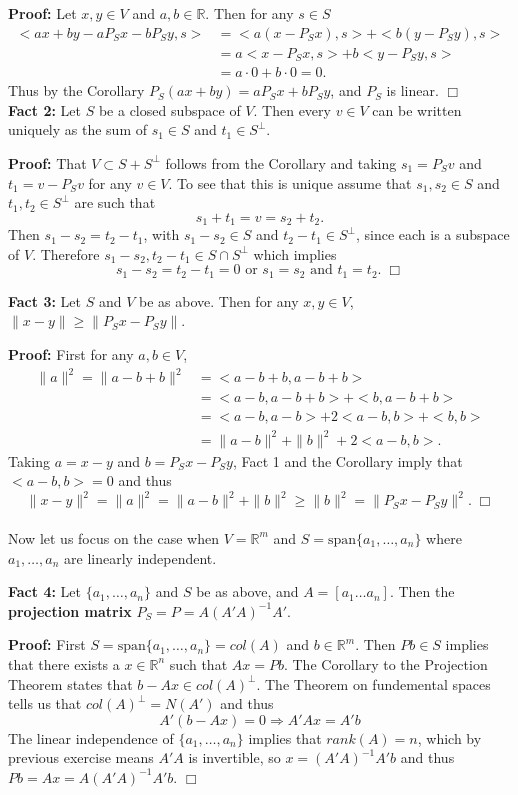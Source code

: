 \documentclass[12pt,oneside]{article}
\begin{document}
\textbf{Proof:} Let \(x,y \in V\) and \(a,b \in \mathbb{R} \). Then for any \(s \in S \)
\begin{align*}
<ax+by-aP_Sx-bP_Sy,s> &=  <a(x-P_Sx),s> + <b(y-P_Sy),s> \\
&= a<x-P_Sx,s> + b<y-P_Sy,s> \\
& = a\cdot 0+b \cdot 0=0.
\end{align*}
Thus by the Corollary \( P_S(ax+by)=aP_Sx+bP_Sy\), and \(P_S\) is linear. \(\Box\) \\

\noindent\textbf{Fact 2:} Let \(S\) be a closed subspace of \(V\). Then every \(v \in V\) can be written uniquely as the sum of \(s_1 \in S\) and \( t_1 \in S^{\perp}\).

\textbf{Proof:} That \( V \subset S + S^{\perp} \) follows from the Corollary and taking \(s_1=P_Sv\) and \(t_1=v-P_Sv\) for any \(v \in V\). To see that this is unique assume that \(s_1,s_2 \in S\) and \(t_1,t_2\in S^{\perp} \) are such that 
\[ s_1+t_1=v=s_2+t_2.\]
Then \(s_1-s_2=t_2-t_1\), with \(s_1-s_2 \in S\) and \( t_2-t_1 \in S^{\perp}\), since each is a subspace of \( V\). Therefore \( s_1-s_2,t_2-t_1 \in S \cap S^{\perp}\) which implies 
\[s_1-s_2=t_2-t_1=0 \text{    or   } s_1=s_2 \text{  and  } t_1=t_2.\; \Box\]


\noindent\textbf{Fact 3:} Let \(S \) and \(V\) be as above. Then for any \(x,y \in V \), \( \|x-y\| \ge \|P_Sx -P_Sy\| \).

\textbf{Proof:} First for any \(a,b \in V\),
\begin{align*}
\|a\|^2=\|a-b+b\|^2&=<a-b+b,a-b+b> \\
&= <a-b,a-b+b>+<b,a-b+b> \\
&= <a-b,a-b>+2<a-b,b>+<b,b> \\
&=\|a-b\|^2+\|b\|^2+2<a-b,b>. 
\end{align*}
Taking \(a=x-y\) and \(b=P_Sx-P_Sy\), Fact 1 and the Corollary imply that \( <a-b,b>=0 \) and thus 
\[ \|x-y\|^2 = \|a\|^2=\|a-b\|^2 +\|b\|^2 \ge \|b\|^2=\|P_Sx-P_Sy \|^2.\; \Box \]\\


Now let us focus on the case when \(V=\mathbb{R}^m\) and \(S=\text{span}\{a_1,\dots,a_n\} \) where \(a_1,\dots,a_n\) are linearly independent. 

\noindent\textbf{Fact 4:} Let \( \{a_1, \dots , a_n\}\)  and \( S\) be as above, and \( A= [a_1 \dots a_n ] \). Then the \textbf{projection matrix} \(P_S=P=A(A'A)^{-1}A'\).

\textbf{Proof:} First \(S=\text{span}\{a_1,\dots,a_n\}=col(A)\) and \(b \in \mathbb{R}^m\). Then \(Pb \in S\) implies that there exists a \(x \in \mathbb{R}^n \) such that \(Ax=Pb\). The Corollary to the Projection Theorem states that \( b-Ax \in col(A)^{\perp}\). The Theorem on fundemental spaces tells us that \( col(A)^{\perp}=N(A') \) and thus 
\[ A'(b-Ax)=0 \Rightarrow  A'Ax=A'b\]
The linear independence of \(\{a_1,\dots,a_n\}\) implies that \(rank(A)=n\), which by previous exercise means \(A'A\) is invertible, so \(x= (A'A)^{-1}A'b\) and thus \(Pb=Ax=A(A'A)^{-1}A'b\).  \(\Box\)\\
\end{document}
